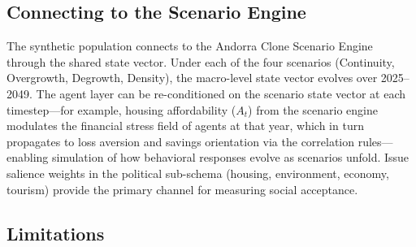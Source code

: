 \documentclass[sustainability,article,submit,pdftex,moreauthors]{Definitions/mdpi}
\begin{document}
\subsection{Connecting to the Scenario Engine}
\label{subsec:connection_to_scenarios}

The synthetic population connects to the Andorra Clone Scenario
Engine~\cite{bartumeu2026andorra} through the shared state vector. Under
each of the four scenarios (Continuity, Overgrowth, Degrowth, Density),
the macro-level state vector evolves over 2025--2049. The agent layer can
be re-conditioned on the scenario state vector at each timestep---for
example, housing affordability ($A_t$) from the scenario engine modulates
the financial stress field of agents at that year, which in turn propagates
to loss aversion and savings orientation via the correlation rules---enabling
simulation of how behavioral responses evolve as scenarios unfold. Issue
salience weights in the political sub-schema (housing, environment, economy,
tourism) provide the primary channel for measuring social acceptance.

\subsection{Limitations}
\label{subsec:limitations}
\end{document}

